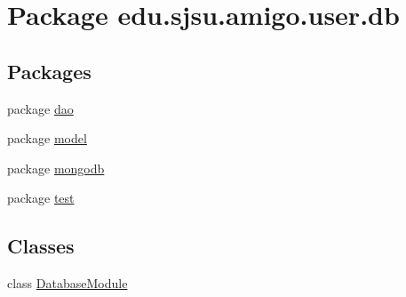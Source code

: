 \hypertarget{namespaceedu_1_1sjsu_1_1amigo_1_1user_1_1db}{}\section{Package edu.\+sjsu.\+amigo.\+user.\+db}
\label{namespaceedu_1_1sjsu_1_1amigo_1_1user_1_1db}
\subsection*{Packages}
\begin{DoxyCompactItemize}
\item 
package \hyperlink{namespaceedu_1_1sjsu_1_1amigo_1_1user_1_1db_1_1dao}{dao}
\item 
package \hyperlink{namespaceedu_1_1sjsu_1_1amigo_1_1user_1_1db_1_1model}{model}
\item 
package \hyperlink{namespaceedu_1_1sjsu_1_1amigo_1_1user_1_1db_1_1mongodb}{mongodb}
\item 
package \hyperlink{namespaceedu_1_1sjsu_1_1amigo_1_1user_1_1db_1_1test}{test}
\end{DoxyCompactItemize}
\subsection*{Classes}
\begin{DoxyCompactItemize}
\item 
class \hyperlink{classedu_1_1sjsu_1_1amigo_1_1user_1_1db_1_1_database_module}{Database\+Module}
\end{DoxyCompactItemize}
